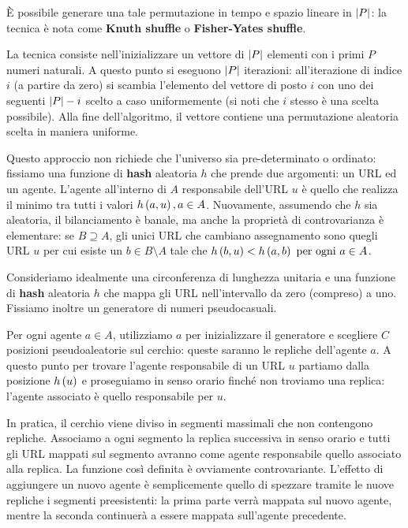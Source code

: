 \documentclass[\main/main.tex]{subfiles}
\begin{document}
\begin{multicols}{2}
\begin{definition}
    È possibile generare una tale permutazione in tempo e spazio lineare in \(\left\lvert P\right\rvert\): la tecnica è nota come \textbf{Knuth shuffle} o \textbf{Fisher-Yates shuffle}.
\end{definition}
\begin{definition}
    La tecnica consiste nell'inizializzare un vettore di \(\left\lvert P\right\rvert\) elementi con i primi \(P\) numeri naturali. A questo punto si eseguono \(\left\lvert P\right\rvert\) iterazioni: all'iterazione di indice \(i\) (a partire da zero) si scambia l'elemento del vettore di posto \(i\) con uno dei seguenti \(\left\lvert P\right\rvert - i \) scelto a caso uniformemente (si noti che \(i\) stesso è una scelta possibile). Alla fine dell'algoritmo, il vettore contiene una permutazione aleatoria scelta in maniera uniforme.
\end{definition}
\begin{definition}
    Questo approccio non richiede che l'universo sia pre-determinato o ordinato: fissiamo una funzione di \textbf{hash} aleatoria \(h\) che prende due argomenti: un URL ed un agente. L'agente all'interno di \(A\) responsabile dell'URL \(u\) è quello che realizza il minimo tra tutti i valori \(h\left(a, u\right), a \in A\). Nuovamente, assumendo che \(h\) sia aleatoria, il bilanciamento è banale, ma anche la proprietà di controvarianza è elementare: se \(B \supseteq A\), gli unici URL che cambiano assegnamento sono quegli URL \(u\) per cui esiste un \(b \in B \setminus A\) tale che \(h\left(b, u\right) < h\left(a, b\right) \text{ per ogni }a \in A\).
\end{definition}
\begin{definition}
    Consideriamo idealmente una circonferenza di lunghezza unitaria e una funzione di \textbf{hash} aleatoria \(h\) che mappa gli URL nell'intervallo da zero (compreso) a uno. Fissiamo inoltre un generatore di numeri pseudocasuali.
    
    Per ogni agente \(a \in A\), utilizziamo \(a\) per inizializzare il generatore e scegliere \(C\) posizioni pseudoaleatorie sul cerchio: queste saranno le repliche dell'agente \(a\). A questo punto per trovare l'agente responsabile di un URL \(u\) partiamo dalla posizione \(h\left(u\right)\) e proseguiamo in senso orario finché non troviamo una replica: l'agente associato è quello responsabile per \(u\).
    
    In pratica, il cerchio viene diviso in segmenti massimali che non contengono repliche. Associamo a ogni segmento la replica successiva in senso orario e tutti gli URL mappati sul segmento avranno come agente responsabile quello associato alla replica. La funzione così definita è ovviamente controvariante. L'effetto di aggiungere un nuovo agente è semplicemente quello di spezzare tramite le nuove repliche i segmenti preesistenti: la prima parte verrà mappata sul nuovo agente, mentre la seconda continuerà a essere mappata sull'agente precedente.
    

\end{definition}
\end{multicols}
\end{document}

